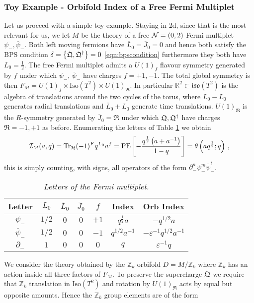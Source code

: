 \documentclass[main.tex]{subfiles}
\begin{document}
\subsubsection{Toy Example - Orbifold Index of a Free Fermi Multiplet}
Let us proceed with a simple toy example. Staying in 2d, since that is the most relevant for us, we let $M$ be the theory of a free $\mathcal{N}=(0,2)$ Fermi multiplet $\psi_{-},\overline{\psi}_{-}$. Both left moving fermions have $\overline{L}_0=\overline{J}_0=0$ and hence both satisfy the BPS condition $\delta=\left\{\mathfrak{Q},\mathfrak{Q}^{\dagger}\right\}=0$ \eqref{eqn:bpscondition} furthermore they both have $L_0=\frac{1}{2}$. The free Fermi multiplet admits a $U(1)_{f}$ flavour symmetry generated by $f$ under which $\psi_{-}$, $\overline{\psi}_{-}$ have charges $f=+1,-1$. The total global symmetry is then $F_M=U(1)_f \times \mathrm{Iso}(T^2)\times U(1)_{\mathfrak{R}}$. In particular $\mathbb{R}^2\subset\mathfrak{iso}(T^2)$ is the algebra of translations around the two cycles of the torus, where $\overline{L}_0-L_0$ generates radial translations and $\overline{L}_0+L_0$ generate time translations. $U(1)_{\mathfrak{R}}$ is the $R$-symmetry generated by $\overline{J}_0=\mathfrak{R}$ under which $\mathfrak{Q},\mathfrak{Q}^{\dagger}$ have charges $\mathfrak{R}=-1,+1$ as before. 
Enumerating the letters of Table \ref{tab:freefermi} we obtain 
\begin{equation}
\mathcal{I}_M(a,q)=\operatorname{Tr}_{\mathcal{H}}(-1)^Fq^{L_0}a^{f}=\operatorname{\mathrm{PE}}\left[-\frac{q^{\frac{1}{2}}\left(a+a^{-1}\right)}{1-q}\right]=\theta\left(aq^{\frac{1}{2}};q\right)\,,
\end{equation}
this is simply counting, with signs, all operators of the form $\partial_-^n\psi_-^m\overline{\psi}_-^l$.
\begin{table}
\centering
 \begin{tabular}{|c|c|c|c|c|c|c|} 
 \hline
 Letter & $L_0$& $\overline{L}_0$& $\overline{J}_0$ & $f$ & Index&Orb Index\\\hline
\hline
$\psi_{-}$&$1/2$&$0$ & $0$ & $+1$& $q^{\frac{1}{2}}a$&$-q^{1/2}a$\\\hline
$\overline\psi_{-}$&$1/2$ &$0$ & $0$ & $-1$& $q^{1/2}a^{-1}$&$-\varepsilon^{-1}q^{1/2}a^{-1}$\\\hline
\hline
$\partial_{-}$ &$1$ &$0$& $0$ &$0$& $q$&$\varepsilon^{-1}q$\\\hline
\end{tabular}
\caption{\it Letters of the Fermi multiplet.}\label{tab:freefermi}
\end{table}
We consider the theory obtained by the $\mathbb{Z}_k$ orbifold $D=M/\mathbb{Z}_k$ where $\mathbb{Z}_k$ has an action inside all three factors of $F_M$. To preserve the supercharge $\mathfrak{Q}$ we require that $\mathbb{Z}_k$ translation in $\mathrm{Iso}(T^2)$ and rotation by $U(1)_{\mathfrak{R}}$ acts by equal but opposite amounts. Hence the $\mathbb{Z}_k$ group elements are of the form
\end{document}
